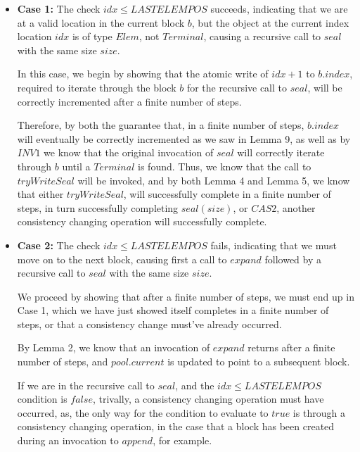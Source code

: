 \documentclass[runningheads,a4paper]{llncs}
\begin{document}
\begin{itemize}

\item \textbf{Case 1:} The check $idx \leq LASTELEMPOS$ succeeds, indicating
that we are at a valid location in the current block $b$, but the object at
the current index location $idx$ is of type $Elem$, not $Terminal$, causing a
recursive call to $seal$ with the same size $size$.

In this case, we begin by showing that the atomic write of $idx+1$ to
$b.index$, required to iterate through the block $b$ for the recursive call to
$seal$, will be correctly incremented after a finite number of steps. 

Therefore, by both the guarantee that, in a finite number of steps, $b.index$
will eventually be correctly incremented as we saw in Lemma 9, as well as by
$INV1$ we know that the original invocation of $seal$ will correctly iterate
through $b$ until a $Terminal$ is found. Thus, we know that the call to
$tryWriteSeal$ will be invoked, and by both Lemma 4 and Lemma 5, we know that
either $tryWriteSeal$, will successfully complete in a finite number of steps,
in turn successfully completing $seal(size)$, or $CAS2$, another consistency
changing operation will successfully complete.

\item \textbf{Case 2:} The check $idx \leq LASTELEMPOS$ fails, indicating that
we must move on to the next block, causing first a call to $expand$ followed
by a recursive call to $seal$ with the same size $size$. 

We proceed by showing that after a finite number of steps, we must end up in
Case 1, which we have just showed itself completes in a finite number of
steps, or that a consistency change must've already occurred. 

By Lemma 2, we know that an invocation of $expand$ returns after a finite
number of steps, and $pool.current$ is updated to point to a subsequent block.

If we are in the recursive call to $seal$, and the $idx \leq LASTELEMPOS$
condition is $false$, trivally, a consistency changing operation must have
occurred, as, the only way for the condition to evaluate to $true$ is through
a consistency changing operation, in the case that a block has been created
during an invocation to $append$, for example.



\end{itemize}
\end{document}
